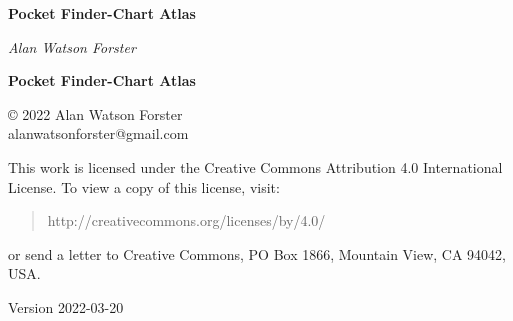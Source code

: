 
\pagestyle{empty}


\begin{center}
\vspace*{1cm}

\begingroup
\Huge\bfseries Pocket Finder-Chart Atlas
\endgroup

\vspace{1cm}

\vspace{1cm}

\begingroup
\large\itshape Alan Watson Forster
\endgroup

\end{center}


\cleardoublepage


\setcounter{page}{1}

\null\vfill

\begin{center}

\begingroup
\huge\bfseries Pocket Finder-Chart Atlas
\endgroup

\end{center}

\vfill

\clearpage


\null\vfill

\begin{raggedright}
\small

© 2022 Alan Watson Forster\\
alanwatsonforster@gmail.com

\medskip

This work is licensed under the Creative Commons Attribution 4.0 International License. To view a copy of this license, visit:
\begin{quote}
 http://creativecommons.org/licenses/by/4.0/ 
\end{quote}
or send a letter to Creative Commons, PO Box 1866, Mountain View, CA 94042, USA.

\medskip

Version 2022-03-20

\end{raggedright}

\cleardoublepage


\pagestyle{plain}

\tableofcontents
